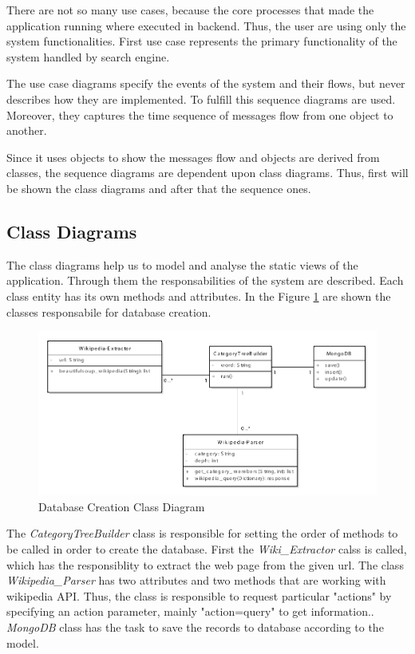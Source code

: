 There are not so many use cases, because the core processes that made the application running where executed in backend. Thus, the user are using only the system functionalities. First use case represents the primary functionality of the system handled by search engine. 

The use case diagrams specify the events of the system and their flows, but never describes how they are implemented. To fulfill this sequence diagrams are used. Moreover, they captures the time sequence of messages flow from one object to another. 

Since it uses objects to show the messages flow and objects are derived from classes, the sequence diagrams are dependent upon class diagrams. Thus, first will be shown the class diagrams and after that the sequence ones. 

\subsection{Class Diagrams}

The class diagrams help us to model and analyse the static views of the application. Through them the responsabilities of the system are described. Each class entity has its own methods and attributes. In the Figure \ref{classCreate_uml} are shown the classes responsabile for database creation. 

\begin{figure}[!ht]
\centering
\includegraphics[width=15cm]{create-db}
\caption{Database Creation Class Diagram}\label{classCreate_uml}
\end{figure}

The \textit{CategoryTreeBuilder} class is responsible for setting the order of methods to be called in order to create the database. First the \textit{Wiki\_Extractor} calss is called, which has the responsiblity to extract the web page from the given url. The class \textit{Wikipedia\_Parser} has two attributes and two methods that are working with wikipedia API. Thus, the class is responsible to request particular "actions" by specifying an action parameter, mainly "action=query" to get information.. \textit{MongoDB} class has the task to save the records to database according to the model.  

